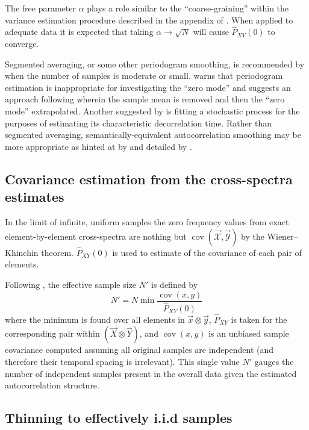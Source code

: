 \documentclass[letterpaper,11pt,nointlimits,reqno]{amsart}
\DeclareMathOperator{\cov}{cov}
\begin{document}
The free parameter $\alpha$ plays a role similar to the ``coarse-graining''
within the variance estimation procedure described in the appendix of
\citet{Hoyas2008Reynolds}.  When applied to adequate data it is expected that
taking $\alpha\to\sqrt{N}$ will cause $\hat{P}_{XY}(0)$ to converge.

Segmented averaging, or some other periodogram smoothing, is recommended by
\citet[\textsection{}17.1.3]{Storch2001Statistical} when the number of samples
is moderate or small.  \citet[\textsection{}12.3.7]{Storch2001Statistical}
warns that periodogram estimation is inappropriate for investigating the ``zero
mode'' and suggests an approach following \citet{Madden1976Estimates} wherein
the sample mean is removed and then the ``zero mode'' extrapolated.  Another
suggested by \citet[\textsection{}17.1.3]{Storch2001Statistical} is fitting a
stochastic process for the purposes of estimating its characteristic
decorrelation time.  Rather than segmented averaging, semantically-equivalent
autocorrelation smoothing may be more appropriate as hinted at by
\citet{Scargle1982Studies} and detailed by \citet{Richards1967Computing}.

\subsection*{Covariance estimation from the cross-spectra estimates}

In the limit of infinite, uniform samples the zero frequency values from exact
element-by-element cross-spectra are nothing but $\cov\left( \vec{\mathscr{X}}
, \vec{\mathscr{Y}} \right)$ by the Wiener--Khinchin theorem.
$\hat{P}_{XY}(0)$ is used to estimate of the covariance of each pair of
elements.

Following \citet{Thiebaux1984Interpretation}, the effective sample size $N'$ is
defined by
$$
    N' = N \min \frac{\cov(x,y)} {\hat{P}_{XY}(0)}
$$
where the minimum is found over all elements in $\vec{x}\otimes\vec{y}$,
$\hat{P}_{XY}$ is taken for the corresponding pair within $\left(\vec{X}
\otimes \vec{Y} \right)$, and $\cov(x,y)$ is an unbiased sample covariance
computed assuming all original samples are independent (and therefore their
temporal spacing is irrelevant).  This single value $N'$ gauges the number of
independent samples present in the overall data given the estimated
autocorrelation structure.

\subsection*{Thinning to effectively i.i.d samples}
\end{document}
